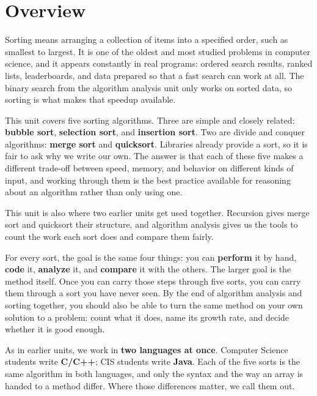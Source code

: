 \documentclass[11pt]{article}
\begin{document}

\section{Overview}

Sorting means arranging a collection of items into a specified order, such as smallest to
largest. It is one of the oldest and most studied problems in computer science, and it
appears constantly in real programs: ordered search results, ranked lists, leaderboards, and
data prepared so that a fast search can work at all. The binary search from the algorithm
analysis unit only works on sorted data, so sorting is what makes that speedup available.

This unit covers five sorting algorithms. Three are simple and closely related:
\textbf{bubble sort}, \textbf{selection sort}, and \textbf{insertion sort}. Two are
divide and conquer algorithms: \textbf{merge sort} and \textbf{quicksort}. Libraries already
provide a sort, so it is fair to ask why we write our own. The answer is that each of these
five makes a different trade-off between speed, memory, and behavior on different kinds of
input, and working through them is the best practice available for reasoning about an
algorithm rather than only using one.

This unit is also where two earlier units get used together. Recursion gives merge sort and
quicksort their structure, and algorithm analysis gives us the tools to count the work each
sort does and compare them fairly.

For every sort, the goal is the same four things: you can \textbf{perform} it by hand,
\textbf{code} it, \textbf{analyze} it, and \textbf{compare} it with the others. The larger
goal is the method itself. Once you can carry those steps through five sorts, you can carry
them through a sort you have never seen. By the end of algorithm analysis and sorting
together, you should also be able to turn the same method on your own solution to a problem:
count what it does, name its growth rate, and decide whether it is good enough.

As in earlier units, we work in \textbf{two languages at once}. Computer Science students
write \textbf{C/C++}; CIS students write \textbf{Java}. Each of the five sorts is the same
algorithm in both languages, and only the syntax and the way an array is handed to a method
differ. Where those differences matter, we call them out.
\end{document}
